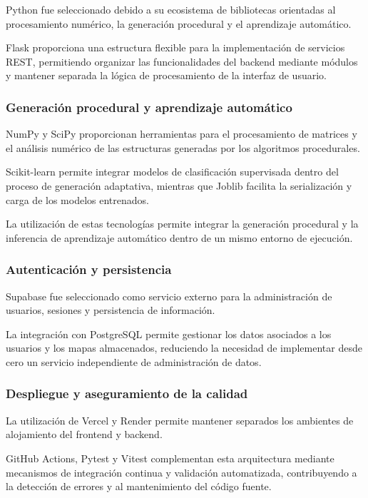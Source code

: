 Python fue seleccionado debido a su ecosistema de bibliotecas orientadas al procesamiento numérico, la generación procedural y el aprendizaje automático.

Flask proporciona una estructura flexible para la implementación de servicios REST, permitiendo organizar las funcionalidades del backend mediante módulos y mantener separada la lógica de procesamiento de la interfaz de usuario.

\subsubsection{Generación procedural y aprendizaje automático}

NumPy y SciPy proporcionan herramientas para el procesamiento de matrices y el análisis numérico de las estructuras generadas por los algoritmos procedurales.

Scikit-learn permite integrar modelos de clasificación supervisada dentro del proceso de generación adaptativa, mientras que Joblib facilita la serialización y carga de los modelos entrenados.

La utilización de estas tecnologías permite integrar la generación procedural y la inferencia de aprendizaje automático dentro de un mismo entorno de ejecución.

\subsubsection{Autenticación y persistencia}

Supabase fue seleccionado como servicio externo para la administración de usuarios, sesiones y persistencia de información.

La integración con PostgreSQL permite gestionar los datos asociados a los usuarios y los mapas almacenados, reduciendo la necesidad de implementar desde cero un servicio independiente de administración de datos.

\subsubsection{Despliegue y aseguramiento de la calidad}

La utilización de Vercel y Render permite mantener separados los ambientes de alojamiento del frontend y backend.

GitHub Actions, Pytest y Vitest complementan esta arquitectura mediante mecanismos de integración continua y validación automatizada, contribuyendo a la detección de errores y al mantenimiento del código fuente.

